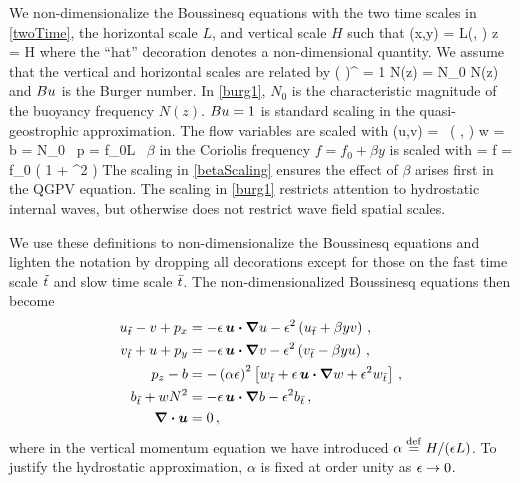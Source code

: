 \documentclass[12pt, oneside]{book}
\begin{document}
We non-dimensionalize the Boussinesq  equations with the two time scales  in \eqref{twoTime}, the horizontal scale $L$, and vertical scale $H$ such that
\beq
(x,y) = L(, ) \com \qquad {} \qquad z = H  \com
\eeq
where the ``hat'' decoration denotes a non-dimensional quantity.  We assume that the vertical and horizontal scales are related by 
\beq
\Bu {} \left (  \right )^{} = 1 \com \qquad {} \qquad N(z) = N_0 \nd N(z) \com
\label{burg1}
\eeq
and $\Bu$ is the Burger number.  In \eqref{burg1}, $N_0$ is the characteristic magnitude of the buoyancy frequency $N(z)$.  $\Bu=1$ is standard scaling in the quasi-geostrophic approximation.  The flow variables are scaled with 
\beq
(u,v) = \tU \, ( ,  ) \com \qquad w =  \tU \,   \com \qquad b = N_0 \tU \,   \com \qquad p = f_0L \tU \,   \per
\label{flowvar}
\eeq
$\beta$ in the Coriolis frequency $f=f_0+\beta y$ is scaled with
\beq
\beta =  \hat \beta \com \qquad {} \qquad f = f_0 \left ( 1 + \ep^2 \nd{\beta}  \right )   \per \label{betaScaling}
\eeq
The scaling in \eqref{betaScaling} ensures the effect of $\beta$ arises first in the QGPV equation.  The scaling in \eqref{burg1} restricts attention to hydrostatic internal waves, but otherwise does not restrict wave field spatial scales.

We use these definitions to non-dimensionalize the Boussinesq equations and lighten the notation by dropping all decorations except for those on the fast time scale $\tt$ and slow time scale $\bt$.  The non-dimensionalized Boussinesq  equations then become
\begin{align}
u_{\tt} - v + p_x &= - \ep  \, \bu \bcdot \bnabla  u - \ep^2 \left ( u_{\bt} + \beta y v \right ) \com \label{xmom1}\\
v_{\tt} + u + p_y &= - \ep \, \bu \bcdot \bnabla  v - \ep^2 \left ( v_{\bt} - \beta y u \right ) \com \\
p_z - b &= - \left ( \alpha \ep \right )^2 \left[w_{\tt} + \ep \, \bu \bcdot \bnabla  w + \ep^2 w_{\bt} \right]  \com \\
b_{\tt} + w N^2 &= - \ep \, \bu \bcdot \bnabla  b - \ep^2 b_{\bt} \label{bcbuoy}\com \\
\diver \bu &= 0 \com \label{cont1}
\end{align}
where in the vertical momentum equation we have introduced  $\alpha \defn H/(\ep L )$. To justify the hydrostatic approximation, $\alpha$ is fixed at order unity as $\ep \to 0$.
\end{document}
